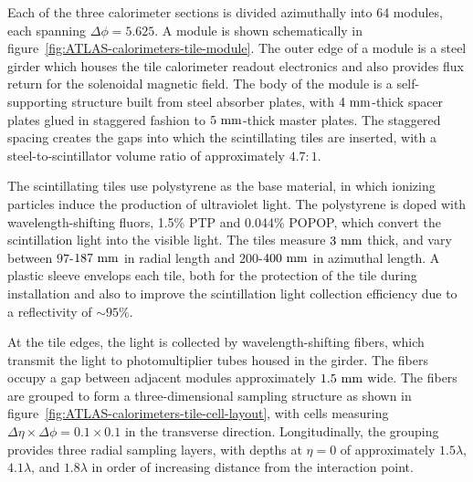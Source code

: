Each of the three calorimeter sections is divided azimuthally into 64 modules, each spanning $\Delta\phi=5.625$. A module is shown schematically in figure~\ref{fig:ATLAS-calorimeters-tile-module}. The outer edge of a module is a steel girder which houses the tile calorimeter readout electronics and also provides flux return for the solenoidal magnetic field. The body of the module is a self-supporting structure built from steel absorber plates, with $4~\mathrm{mm}$-thick spacer plates glued in staggered fashion to $5~\mathrm{mm}$-thick master plates. The staggered spacing creates the gaps into which the scintillating tiles are inserted, with a steel-to-scintillator volume ratio of approximately $4.7:1$. 

The scintillating tiles use polystyrene as the base material, in which ionizing particles induce the production of ultraviolet light. The polystyrene is doped with wavelength-shifting fluors, 1.5\% PTP and 0.044\% POPOP, which convert the scintillation light into the visible light. The tiles measure $3~\mathrm{mm}$ thick, and vary between $97$-$187~\mathrm{mm}$ in radial length and $200$-$400~\mathrm{mm}$ in azimuthal length. A plastic sleeve envelops each tile, both for the protection of the tile during installation and also to improve the scintillation light collection efficiency due to a reflectivity of $\sim 95\%$. 

At the tile edges, the light is collected by wavelength-shifting fibers, which transmit the light to photomultiplier tubes housed in the girder. The fibers occupy a gap between adjacent modules approximately $1.5~\mathrm{mm}$ wide. The fibers are grouped to form a three-dimensional sampling structure as shown in figure~\ref{fig:ATLAS-calorimeters-tile-cell-layout}, with cells measuring $\Delta\eta\times\Delta\phi=0.1\times0.1$ in the transverse direction. Longitudinally, the grouping provides three radial sampling layers, with depths at $\eta=0$ of approximately $1.5\lambda$, $4.1\lambda$, and $1.8\lambda$ in order of increasing distance from the interaction point. 

